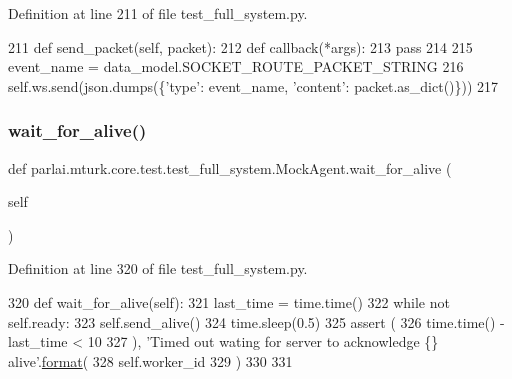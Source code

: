 Definition at line 211 of file test\+\_\+full\+\_\+system.\+py.


\begin{DoxyCode}
211     \textcolor{keyword}{def }send\_packet(self, packet):
212         \textcolor{keyword}{def }callback(*args):
213             \textcolor{keywordflow}{pass}
214 
215         event\_name = data\_model.SOCKET\_ROUTE\_PACKET\_STRING
216         self.ws.send(json.dumps(\{\textcolor{stringliteral}{'type'}: event\_name, \textcolor{stringliteral}{'content'}: packet.as\_dict()\}))
217 
\end{DoxyCode}
\mbox{\label{classparlai_1_1mturk_1_1core_1_1test_1_1test__full__system_1_1MockAgent_a92e5fffe32ac3011adeedbdc34b5506c}} 
\subsubsection{\texorpdfstring{wait\+\_\+for\+\_\+alive()}{wait\_for\_alive()}}
{\footnotesize\ttfamily def parlai.\+mturk.\+core.\+test.\+test\+\_\+full\+\_\+system.\+Mock\+Agent.\+wait\+\_\+for\+\_\+alive (\begin{DoxyParamCaption}\item[{}]{self }\end{DoxyParamCaption})}



Definition at line 320 of file test\+\_\+full\+\_\+system.\+py.


\begin{DoxyCode}
320     \textcolor{keyword}{def }wait\_for\_alive(self):
321         last\_time = time.time()
322         \textcolor{keywordflow}{while} \textcolor{keywordflow}{not} self.ready:
323             self.send\_alive()
324             time.sleep(0.5)
325             \textcolor{keyword}{assert} (
326                 time.time() - last\_time < 10
327             ), \textcolor{stringliteral}{'Timed out wating for server to acknowledge \{\} alive'}.\hyperlink{namespaceparlai_1_1chat__service_1_1services_1_1messenger_1_1shared__utils_a32e2e2022b824fbaf80c747160b52a76}{format}(
328                 self.worker\_id
329             )
330 
331 
\end{DoxyCode}


